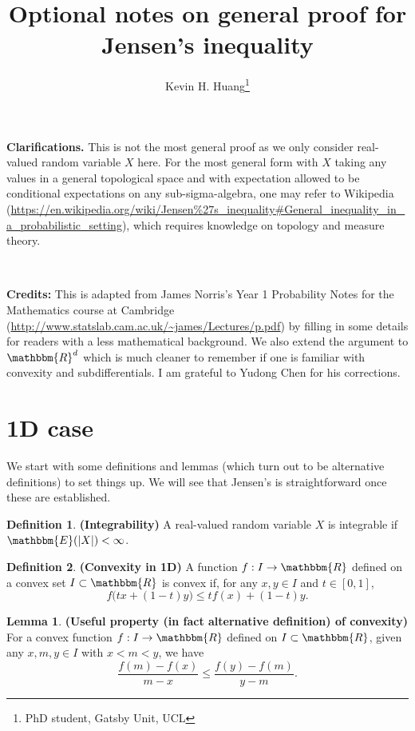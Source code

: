 \documentclass[10pt,a4paper]{article}
\title{Optional notes on general proof for Jensen's inequality}
\author{Kevin H. Huang\footnote{PhD student, Gatsby Unit, UCL}}
\theoremstyle{definition}
\newtheorem{lemma}[theorem]{Lemma}\newtheorem*{remark}{Remark}\newtheorem*{notation}{Notation}
\newtheorem*{definition}{Definition}
\def\E{\mathbbm{E}}
\def\R{\mathbbm{R}}
\begin{document}

\onehalfspacing

\maketitle

\vspace{-20pt}

\textbf{Clarifications.} This is not the most general proof as we only consider real-valued random variable $X$ here. For the most general form with $X$ taking any values in a general topological space and with expectation allowed to be conditional expectations on any sub-sigma-algebra, one may refer to Wikipedia (\url{https://en.wikipedia.org/wiki/Jensen\%27s_inequality#General_inequality_in_a_probabilistic_setting}), which requires knowledge on topology and measure theory.

\ 

\noindent
\textbf{Credits:} This is adapted from James Norris's Year 1 Probability Notes for the Mathematics course at Cambridge (\url{http://www.statslab.cam.ac.uk/~james/Lectures/p.pdf}) by filling in some details for readers with a less mathematical background. We also extend the argument to $\R^d$ which is much cleaner to remember if one is familiar with convexity and subdifferentials. I am grateful to Yudong Chen for his corrections.

\section{1D case}

We start with some definitions and lemmas (which turn out to be alternative definitions) to set things up. We will see that Jensen's is straightforward once these are established.

\begin{definition}\textbf{(Integrability)}
A real-valued random variable $X$ is integrable if $\E(|X|) < \infty$.
\end{definition}

\begin{definition}\textbf{(Convexity in 1D)} A function $f: I \rightarrow \R$ defined on a convex set $I \subset \R$ is convex if, for any $x,y \in I$ and $t \in [0,1]$,
$$f\big(tx+(1-t)y\big) \leq tf(x) + (1-t)y.$$
\end{definition}

\begin{lemma} \label{alt_conv} \textbf{(Useful property (in fact alternative definition) of convexity)}
For a convex function $f: I \rightarrow \R$ defined on $I \subset \R$, given any $x, m, y \in I$ with $x < m < y$, we have
$$\frac{f(m)-f(x)}{m-x} \leq \frac{f(y)-f(m)}{y-m}.$$ 
\end{lemma}
\end{document}
